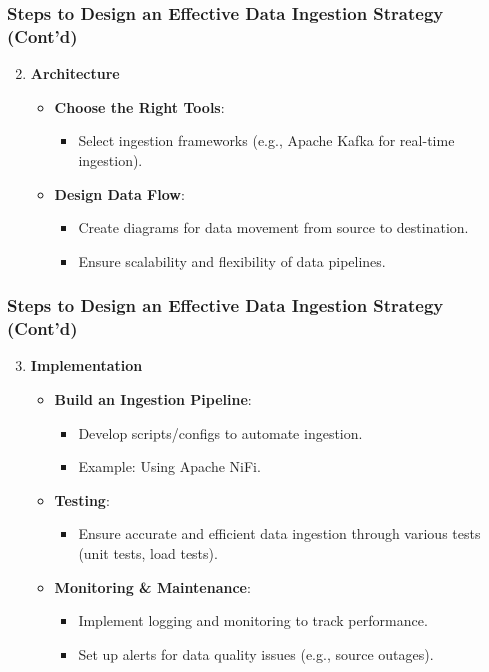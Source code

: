 \documentclass{beamer}
\begin{document}
\begin{frame}[fragile]
    \frametitle{Steps to Design an Effective Data Ingestion Strategy (Cont'd)}
    \begin{enumerate}
        \setcounter{enumi}{1} %
        \item \textbf{Architecture}
        \begin{itemize}
            \item \textbf{Choose the Right Tools}: 
            \begin{itemize}
                \item Select ingestion frameworks (e.g., Apache Kafka for real-time ingestion).
            \end{itemize}
            \item \textbf{Design Data Flow}: 
            \begin{itemize}
                \item Create diagrams for data movement from source to destination.
                \item Ensure scalability and flexibility of data pipelines.
            \end{itemize}
        \end{itemize}
    \end{enumerate}
\end{frame}

\begin{frame}[fragile]
    \frametitle{Steps to Design an Effective Data Ingestion Strategy (Cont'd)}
    \begin{enumerate}
        \setcounter{enumi}{2} %
        \item \textbf{Implementation}
        \begin{itemize}
            \item \textbf{Build an Ingestion Pipeline}: 
            \begin{itemize}
                \item Develop scripts/configs to automate ingestion.
                \item Example: Using Apache NiFi.
            \end{itemize}
            \item \textbf{Testing}: 
            \begin{itemize}
                \item Ensure accurate and efficient data ingestion through various tests (unit tests, load tests).
            \end{itemize}
            \item \textbf{Monitoring \& Maintenance}: 
            \begin{itemize}
                \item Implement logging and monitoring to track performance.
                \item Set up alerts for data quality issues (e.g., source outages).
            \end{itemize}
        \end{itemize}
    \end{enumerate}
\end{frame}
\end{document}
